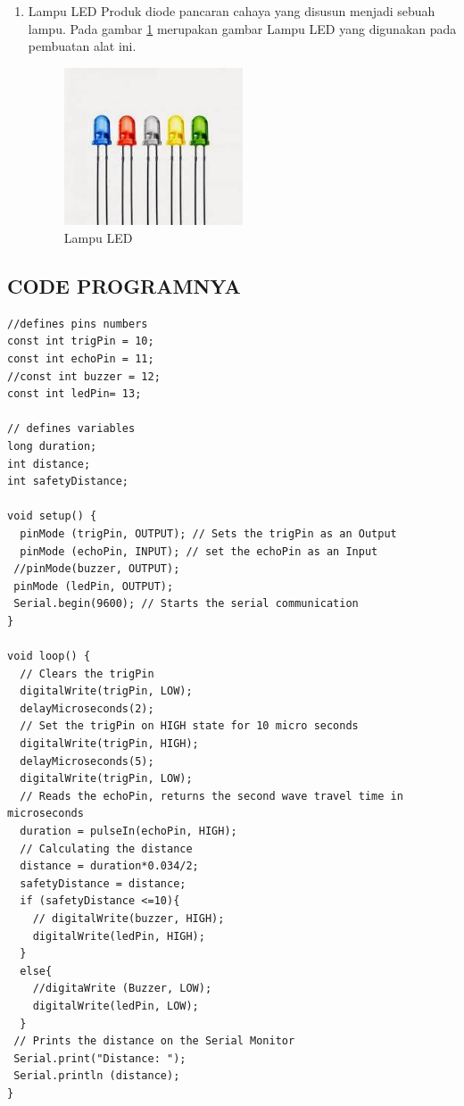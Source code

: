 \begin{enumerate}
\item Lampu LED
\subitem Produk diode pancaran cahaya yang disusun menjadi sebuah lampu. Pada gambar \ref{labelgambar6} merupakan gambar Lampu LED yang digunakan pada pembuatan alat ini.
	\begin{figure}[htbp]
	\centering
	\includegraphics[width=0.5\textwidth]{figures/ALAT_PENDETEKSI_BANJIR/lampu_led_1c}
	\caption{Lampu LED}
	\label{labelgambar6}
	\end{figure}
\end{enumerate}

\subsection{CODE PROGRAMNYA}
\begin{lstlisting}
//defines pins numbers
const int trigPin = 10;
const int echoPin = 11;
//const int buzzer = 12;
const int ledPin= 13;

// defines variables
long duration;
int distance;
int safetyDistance;

void setup() {
  pinMode (trigPin, OUTPUT); // Sets the trigPin as an Output
  pinMode (echoPin, INPUT); // set the echoPin as an Input
 //pinMode(buzzer, OUTPUT);
 pinMode (ledPin, OUTPUT);
 Serial.begin(9600); // Starts the serial communication
}

void loop() {
  // Clears the trigPin
  digitalWrite(trigPin, LOW);
  delayMicroseconds(2);
  // Set the trigPin on HIGH state for 10 micro seconds
  digitalWrite(trigPin, HIGH);
  delayMicroseconds(5);
  digitalWrite(trigPin, LOW);
  // Reads the echoPin, returns the second wave travel time in microseconds
  duration = pulseIn(echoPin, HIGH);
  // Calculating the distance
  distance = duration*0.034/2;
  safetyDistance = distance;
  if (safetyDistance <=10){
    // digitalWrite(buzzer, HIGH);
    digitalWrite(ledPin, HIGH);
  }
  else{
    //digitaWrite (Buzzer, LOW);
    digitalWrite(ledPin, LOW);
  }
 // Prints the distance on the Serial Monitor
 Serial.print("Distance: ");
 Serial.println (distance);
}
\end{lstlisting}

